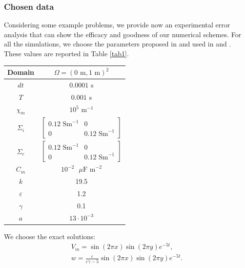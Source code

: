 \documentclass[a4paper,11pt]{article}
\begin{document}
\subsubsection{Chosen data}
Considering some example problems, we provide now an experimental error analysis that can show the efficacy and goodness of our numerical schemes. For all the simulations, we  choose the parameters proposed in \cite{bagnara} and used in \cite{andreotti} and \cite{marta}. These values are reported in Table \ref{tab1}.
\begin{center}
	\label{tab1}
	\begin{tabular}{|c|c|} 
		\hline 
		\rule[-4mm]{0mm}{1cm}
		Domain & $\Omega=(0 \text{ m},1 \text{ m})^2$ \\
		\hline 
		\rule[-4mm]{0mm}{1cm}
		$dt$ & $0.0001 \text{ s}$ \\
		\hline
		\rule[-4mm]{0mm}{1cm}
		$T$ & $0.001 \text{ s}$ \\
		\hline
		\rule[-4mm]{0mm}{1cm}
		$\chi_m$ & $10^5 \text{ m}^{-1}$ \\
		\hline
		\rule[-4mm]{0mm}{1cm}
		$\Sigma_i$ & $\begin{bmatrix} 0.12 \text{ Sm}^{-1} & 0 \\ 0 & 0.12 \text{ Sm}^{-1} \end{bmatrix}$ \\
		\hline
		\rule[-4mm]{0mm}{1cm}
		$\Sigma_e$ & $\begin{bmatrix} 0.12 \text{ Sm}^{-1} & 0 \\ 0 & 0.12 \text{ Sm}^{-1} \end{bmatrix}$ \\
		\hline
		\rule[-4mm]{0mm}{1cm}
		$C_m$ & $10^{-2} \text{ $\mu$F m}^{-2}$ \\
		\hline
		\rule[-4mm]{0mm}{1cm}
		$k$ & 19.5 \\ 
		\hline
		\rule[-4mm]{0mm}{1cm}
		$\varepsilon$ & 1.2 \\
		\hline
		\rule[-4mm]{0mm}{1cm}
		$\gamma$ & 0.1 \\
		\hline
		\rule[-4mm]{0mm}{1cm}
		$a$ & $13 \cdot 10^{-3}$ \\
		\hline
		
	\end{tabular}
\end{center}
\vspace{3mm}
\noindent We choose the exact solutions:
\begin{equation*}
\begin{gathered}
V_m = \sin(2 \pi x) \sin(2 \pi y) e^{-5 t}, \\
w = \frac{\varepsilon}{\varepsilon \gamma-5} \sin(2 \pi x) \sin(2 \pi y) e^{-5 t}.
\end{gathered}
\end{equation*}
\end{document}
